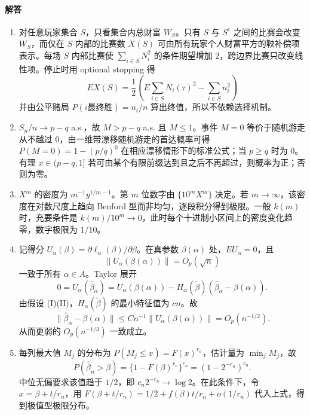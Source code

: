 \documentclass[UTF8,12pt]{ctexart}
\begin{document}
\paragraph{解答}
\begin{enumerate}[label=\textbf{\arabic*.},leftmargin=2.2em]
\item 对任意玩家集合 \(S\)，只看集合内总财富 \(W_S\)。只有 \(S\) 与 \(S^c\) 之间的比赛会改变 \(W_S\)，而仅在 \(S\) 内部的比赛数 \(X(S)\) 可由所有玩家个人财富平方的鞅补偿项表示。每场 \(S\) 内部比赛使 \(\sum_{i\in S}N_i^2\) 的条件期望增加 \(2\)，跨边界比赛只改变线性项。停止时用 optional stopping 得
\[
E X(S)=\frac12\left(E\sum_{i\in S}N_i(\tau)^2-\sum_{i\in S}n_i^2\right)
\]
并由公平赌局 \(P(i\text{最终胜})=n_i/n\) 算出终值，所以不依赖选择机制。

\item \(S_n/n\to p-q\) a.s.，故 \(M>p-q\) a.s. 且 \(M\le1\)。事件 \(M=0\) 等价于随机游走从不越过 \(0\)，由一维带漂移随机游走的首达概率可得 \(P(M=0)=1-(p/q)^0\) 在相应漂移情形下的标准公式；当 \(p\ge q\) 时为 \(0\)。有理 \(x\in(p-q,1]\) 若可由某个有限前缀达到且之后不再超过，则概率为正；否则为零。

\item \(X^m\) 的密度为 \(m^{-1}y^{1/m-1}\)。第 \(m\) 位数字由 \(\{10^mX^m\}\) 决定。若 \(m\to\infty\)，该密度在对数尺度上趋向 Benford 型而非均匀，逐段积分得到极限。一般 \(k(m)\) 时，充要条件是 \(k(m)/10^m\to0\)，此时每个十进制小区间上的密度变化趋零，数字极限为 \(1/10\)。

\item 记得分 \(U_\alpha(\beta)=\partial \ell_\alpha(\beta)/\partial\beta\)。在真参数 \(\beta(\alpha)\) 处，\(E U_\alpha=0\)，且
\[
\|U_\alpha(\beta(\alpha))\|=O_p(\sqrt n)
\]
一致于所有 \(\alpha\in A\)。Taylor 展开
\[
0=U_\alpha(\hat\beta_\alpha)=U_\alpha(\beta(\alpha))-H_\alpha(\tilde\beta)(\hat\beta_\alpha-\beta(\alpha)).
\]
由假设 (I)(II)，\(H_\alpha(\tilde\beta)\) 的最小特征值为 \(cn\)。故
\[
\|\hat\beta_\alpha-\beta(\alpha)\|\le Cn^{-1}\|U_\alpha(\beta(\alpha))\|=O_p(n^{-1/2}).
\]
从而更弱的 \(O_p(n^{-1/3})\) 一致成立。

\item 每列最大值 \(M_j\) 的分布为 \(P(M_j\le x)=F(x)^{r_n}\)，估计量为 \(\min_jM_j\)，故
\[
P(\hat\beta_n>\beta)=\{1-F(\beta)^{r_n}\}^{c_n}=(1-2^{-r_n})^{c_n}.
\]
中位无偏要求该值趋于 \(1/2\)，即 \(c_n2^{-r_n}\to\log2\)。在此条件下，令 \(x=\beta+t/r_n\)，用 \(F(\beta+t/r_n)=1/2+f(\beta)t/r_n+o(1/r_n)\) 代入上式，得到极值型极限分布。
\end{enumerate}
\end{document}
